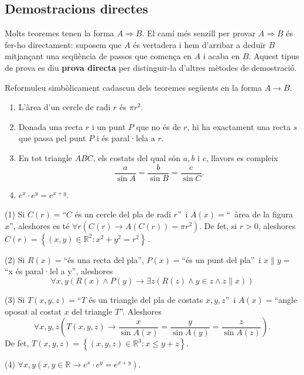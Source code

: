 \subsection{Demostracions directes}

Molts teoremes tenen la forma $A\Longrightarrow B$. El camí més
senzill per provar $A\Longrightarrow B$ és fer-ho directament: suposem
que $A$ és vertadera i hem d'arribar a deduïr $B$ mitjançant
una seqüència de passos que comença en $A$ i acaba en $B$.
Aquest tipus de prova es diu \textbf{prova directa} per distinguir-la
d'altres mètodes de demostració.

\begin{exemple}
Reformuleu simbòlicament cadascun dels teoremes següents en la forma
$A\longrightarrow B$.

\begin{enumerate}
\item L'àrea d'un cercle de radi $r$ és $\pi r^{2}$.

\item Donada una recta $r$ i un punt $P$ que no és de $r$, hi ha
exactament una recta $s$ que passa pel punt $P$ i és
paral·lela a $r$.

\item En tot triangle $ABC$, els costats del qual són $a,b$ i $c$,
llavors es compleix\begin{equation*}
\frac{a}{\sin A}=\frac{b}{\sin B}=\frac{c}{\sin C}\text{.}
\end{equation*}

\item $e^{x}\cdot e^{y}=e^{x+y}$.
\end{enumerate}
\end{exemple}

\begin{solucio}
(1) Si $C(r)=$\enquote{$C$ és un cercle del pla de radi $r$}\ i $A(x)=$\enquote{\ àrea de la figura $x$}, aleshores es té $\forall r\left( C(r)\longrightarrow
A(C(r))=\pi r^{2}\right).$ De fet, si $r>0$, aleshores $C(r)=\left\{ \left(
x,y\right) \in\mathbb{R}^{2}:x^{2}+y^{2}=r^{2}\right\} \,$.

(2) Si $R(x)=$\enquote{és una recta del pla}, $P(x)=$\enquote{és un punt del pla}\ i $x\parallel y=$\enquote{x és paral·lel a
y}, aleshores\begin{equation*}
\forall x,y\left( R(x)\wedge P(y)\longrightarrow\exists z\left( R(z)\wedge
y\in z\wedge z\parallel x\right) \right)
\end{equation*}

(3) Si $T(x,y,z)=$\enquote{$T$ és un triangle del pla de costats
$x,y,z$}\ i $A(x)=$\enquote{angle oposat al costat
$x$ del triangle $T$}. Aleshores\begin{equation*}
\forall x,y,z\left( T(x,y,z)\longrightarrow\frac{x}{\sin A(x)}=\frac{y}{\sin
A(y)}=\frac{z}{\sin A(z)}\right) \text{.}
\end{equation*}
De fet, $T(x,y,z)=\left\{ (x,y,z)\in\mathbb{R}^{3}:x\leq y+z\right\}.$

(4) $\forall x,y\left( x,y\in\mathbb{R}\longrightarrow e^{x}\cdot
e^{y}=e^{x+y}\right).$
\end{solucio}

